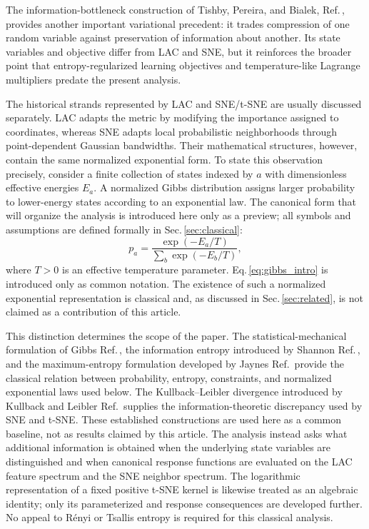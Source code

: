 \documentclass[11pt,a4paper]{article}
\theoremstyle{definition}
\theoremstyle{plain}
\begin{document}
The information-bottleneck construction of Tishby, Pereira, and Bialek, Ref.\,\cite{tishby1999ib}, provides another important variational precedent: it trades compression of one random variable against preservation of information about another. Its state variables and objective differ from LAC and SNE, but it reinforces the broader point that entropy-regularized learning objectives and temperature-like Lagrange multipliers predate the present analysis.


The historical strands represented by LAC and SNE/t-SNE are usually discussed separately. LAC adapts the metric by modifying the importance assigned to coordinates, whereas SNE adapts local probabilistic neighborhoods through point-dependent Gaussian bandwidths. Their mathematical structures, however, contain the same normalized exponential form. To state this observation precisely, consider a finite collection of states indexed by $a$ with dimensionless effective energies $E_a$. A normalized Gibbs distribution assigns larger probability to lower-energy states according to an exponential law. The canonical form that will organize the analysis is introduced here only as a preview; all symbols and assumptions are defined formally in Sec.\,\ref{sec:classical}:
\begin{equation}
    p_a
    =\frac{\exp(-E_a/T)}{\sum_b\exp(-E_b/T)},
    \label{eq:gibbs_intro}
\end{equation}
where $T>0$ is an effective temperature parameter. Eq.\,\eqref{eq:gibbs_intro} is introduced only as common notation. The existence of such a normalized exponential representation is classical and, as discussed in Sec.\,\ref{sec:related}, is not claimed as a contribution of this article.

This distinction determines the scope of the paper. The statistical-mechanical formulation of Gibbs Ref.\,\cite{gibbs1902}, the information entropy introduced by Shannon Ref.\,\cite{shannon1948}, and the maximum-entropy formulation developed by Jaynes Ref.\,\cite{jaynes1957} provide the classical relation between probability, entropy, constraints, and normalized exponential laws used below. The Kullback--Leibler divergence introduced by Kullback and Leibler Ref.\,\cite{kullback1951} supplies the information-theoretic discrepancy used by SNE and t-SNE. These established constructions are used here as a common baseline, not as results claimed by this article. The analysis instead asks what additional information is obtained when the underlying state variables are distinguished and when canonical response functions are evaluated on the LAC feature spectrum and the SNE neighbor spectrum. The logarithmic representation of a fixed positive t-SNE kernel is likewise treated as an algebraic identity; only its parameterized and response consequences are developed further. No appeal to R\'enyi or Tsallis entropy is required for this classical analysis.
\end{document}
